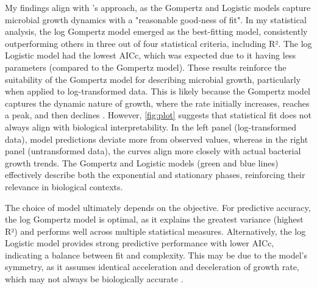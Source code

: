 \documentclass[11pt]{article}
\begin{document}
My findings align with \cite[]{Gibson1988}’s approach, as the Gompertz and Logistic models capture microbial growth dynamics with a "reasonable good-ness of fit". In my statistical analysis, the log Gompertz model emerged as the best-fitting model, consistently outperforming others in three out of four statistical criteria, including R². The log Logistic model had the lowest AICc, which was expected due to it having less parameters (compared to the Gompertz model). These results reinforce the suitability of the Gompertz model for describing microbial growth, particularly when applied to log-transformed data. This is likely because the Gompertz model captures the dynamic nature of growth, where the rate initially increases, reaches a peak, and then declines \parencite[]{Gibson1988, Jason1983}. However, \autoref{fig:plot} suggests that statistical fit does not always align with biological interpretability. In the left panel (log-transformed data), model predictions deviate more from observed values, whereas in the right panel (untransformed data), the curves align more closely with actual bacterial growth trends. The Gompertz and Logistic models (green and blue lines) effectively describe both the exponential and stationary phases, reinforcing their relevance in biological contexts.

The choice of model ultimately depends on the objective. For predictive accuracy, the log Gompertz model is optimal, as it explains the greatest variance (highest R²) and performs well across multiple statistical measures. Alternatively, the log Logistic model provides strong predictive performance with lower AICc, indicating a balance between fit and complexity. This may be due to the model's symmetry, as it assumes identical acceleration and deceleration of growth rate, which may not always be biologically accurate \parencite[]{Gibson1988}.
\end{document}
